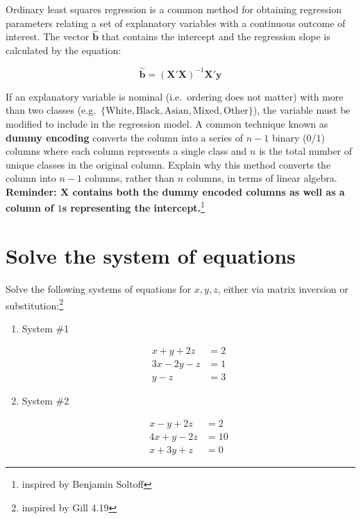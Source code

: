 \documentclass[
]{article}
\begin{document}
Ordinary least squares regression is a common method for obtaining
regression parameters relating a set of explanatory variables with a
continuous outcome of interest. The vector \(\hat{\mathbf{b}}\) that
contains the intercept and the regression slope is calculated by the
equation:

\[\hat{\mathbf{b}} = (\mathbf{X'X})^{-1}\mathbf{X'y}\]

If an explanatory variable is nominal (i.e.~ordering does not matter)
with more than two classes
(e.g.~\(\{\text{White}, \text{Black}, \text{Asian}, \text{Mixed}, \text{Other}\}\)),
the variable must be modified to include in the regression model. A
common technique known as \textbf{dummy encoding} converts the column
into a series of \(n-1\) binary (\(0/1\)) columns where each column
represents a single class and \(n\) is the total number of unique
classes in the original column. Explain why this method converts the
column into \(n-1\) columns, rather than \(n\) columns, in terms of
linear algebra. \textbf{Reminder: \(\mathbf{X}\) contains both the dummy
encoded columns as well as a column of \(1\)s representing the
intercept.}\footnote{inspired by Benjamin Soltoff}

\section{Solve the system of
equations}\label{solve-the-system-of-equations}

Solve the following systems of equations for \(x, y, z\), either via
matrix inversion or substitution:\footnote{inspired by Gill 4.19}

\begin{enumerate}
\def\labelenumi{\alph{enumi}.}
\item
  System \#1

  \[
   \begin{aligned}
       x +   y + 2z &=  2 \\
       3x -  2y -  z &= 1 \\
       y -  z &= 3
   \end{aligned}
   \]
\item
  System \#2

  \[
   \begin{aligned}
   x - y + 2z &= 2 \\
   4x + y -2z &= 10 \\
   x + 3y +z &= 0
   \end{aligned}
   \]
\end{enumerate}
\end{document}
